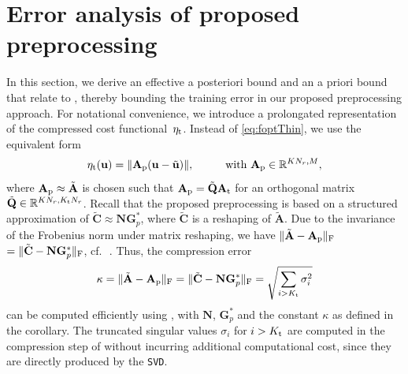 \documentclass[onefignum,onetabnum]{siamart251104}
\newcommand{\bv}[1]{{\mathbf #1}}
\newcommand{\bt}[1]{{\mathbf{#1}}}
\newcommand{\prol}[1]{{{#1}_{\rm{p}}}} %
\newcommand{\thi}[1]{{{#1}_{\rm{t}}}}	%
\newcommand{\Nr}{{N_r}}
\newcommand{\R}{\mathbb{R}}
\newcommand{\acro}[1]{{\texttt{#1}}}  %
\newcommand{\vwei}{\bv{u}} %
\newcommand{\Ap}{{\bt{A}}}
\newcommand{\fopt}{{\eta}}
\newcommand{\Cp}{{\bt{C}}}
\newcommand{\blsRevB}[1]{{{#1}}} %
\begin{document}
\section{Error analysis of proposed preprocessing} \label{sec:error-analysis}
In this section, we derive an effective a posteriori bound and an a priori bound that relate  to , thereby bounding the training error in our proposed preprocessing approach.
For notational convenience, we introduce a prolongated representation of the compressed cost functional~$\thi{\fopt}$. Instead of \eqref{eq:foptThin}, we use the equivalent form
\begin{align} \label{eq:costFunProl}
	\thi{\fopt}(\vwei) = \| \prol{\Ap}( \vwei - \tilde{\vwei}) \|, \hspace{1cm} \text{with } \prol{\Ap}\in \R^{{K}\Nr , M},
\end{align}
where $\prol{\Ap} \approx \tilde{\Ap}$ is chosen such that $\prol{\Ap}= \tilde{\bt{Q}}\thi{\Ap}$ for an orthogonal matrix $\tilde{\bt{Q}} \in \R^{K\Nr , \thi{K}\Nr}$.
Recall that the proposed preprocessing is based on a structured approximation of $\tilde{\Cp} \approx \bt{N} {\bt{G}}_p^*$, where $\tilde{\Cp}$ is a \blsRevB{reshaping} of $\tilde{\Ap}$. Due to the invariance of the Frobenius norm under matrix \blsRevB{reshaping}, we have $\| \tilde{\Ap} - \prol{\Ap} \|_{\rm{F}}$ $=\|  \tilde{\Cp} - \bt{N} {\bt{G}}_p^* \|_{\rm{F}}$, cf.\,~.
Thus, the compression error
\begin{align} \label{eq:kap-error}
\kappa = \| \tilde{\Ap} - \prol{\Ap} \|_{\rm{F}} = \|  \tilde{\Cp} - \bt{N} {\bt{G}}_p^* \|_{\rm{F}} = \sqrt{\sum_{i > \thi{K}} \sigma_i^2}
\end{align}
can be computed efficiently using , with $\bt{N}$, ${\bt{G}}_p^*$ and the constant $\kappa$ as defined in the corollary. The truncated singular values $\sigma_i$ for $i> \thi{K}$ are computed in the compression step of  without incurring additional computational cost, since they are directly produced by the \acro{SVD}.
%
\end{document}
